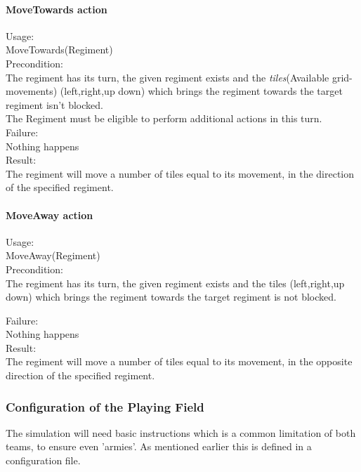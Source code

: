 		\paragraph{MoveTowards action}
		Usage: \\
		MoveTowards(Regiment) \\
		
		Precondition: \\
		The regiment has its turn, the given regiment exists and the \textit{tiles}(Available grid-movements) (left,right,up down) 
		which brings the regiment towards the target regiment isn't blocked.\\
		The Regiment must be eligible to perform additional actions in this turn.\\
		
		Failure: \\
		Nothing happens \\
		
		Result: \\
		The regiment will move a number of tiles equal to its movement, in the direction of the specified regiment.
		
		\paragraph{MoveAway action}
		Usage: \\
		MoveAway(Regiment) \\
		
		Precondition: \\
		The regiment has its turn, the given regiment exists and the tiles (left,right,up down) 
		which brings the regiment towards the target regiment is not blocked.
		
		Failure: \\
		Nothing happens \\
		
		Result: \\
		The regiment will move a number of tiles equal to its movement, in the opposite direction of the specified regiment.
				
		\subsubsection{Configuration of the Playing Field}
		The simulation will need basic instructions which is a common limitation of both teams, to ensure even 'armies'. 
		As mentioned earlier this is defined in a configuration file.
		
